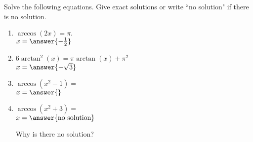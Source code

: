 \documentclass{ximera}
\author{Elizabeth Campolongo}
\begin{document}
\begin{exercise}
Solve the following equations. Give exact solutions or write ``no solution" if there is no solution. 
%
\begin{enumerate}

\item $\arccos(2x) = \pi.$\\
$x = \answer{-\frac{1}{2}}$

\item $6\arctan^2(x)=\pi \arctan(x) + \pi^2$\\
$x = \answer{-\sqrt{3}}$

\item $\arccos(x^2-1) = $ \\
$x = \answer{}$

\item $\arccos(x^2+3) = $ \\
$x = \answer{\text{no solution}}$
\begin{exercise}
Why is there no solution?
\begin{multipleChoice}
\choice{}
\choice{}
\end{multipleChoice}
\end{exercise}

\end{enumerate}

\end{exercise}
\end{document}
